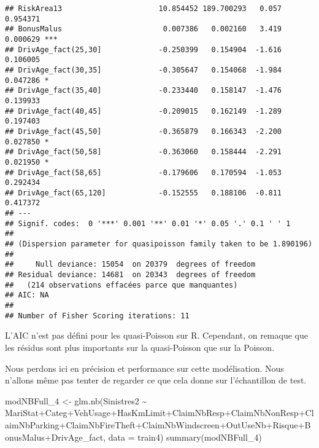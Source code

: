 \documentclass[
]{article}
\newenvironment{Shaded}{\begin{snugshade}}{\end{snugshade}}
\newcommand{\AttributeTok}[1]{\textcolor[rgb]{0.77,0.63,0.00}{#1}}
\newcommand{\FunctionTok}[1]{\textcolor[rgb]{0.00,0.00,0.00}{#1}}
\newcommand{\NormalTok}[1]{#1}
\newcommand{\OtherTok}[1]{\textcolor[rgb]{0.56,0.35,0.01}{#1}}
\newcommand{\SpecialCharTok}[1]{\textcolor[rgb]{0.00,0.00,0.00}{#1}}
\begin{document}
\begin{verbatim}
## RiskArea13                      10.854452 189.700293   0.057 0.954371    
## BonusMalus                       0.007386   0.002160   3.419 0.000629 ***
## DrivAge_fact(25,30]             -0.250399   0.154904  -1.616 0.106005    
## DrivAge_fact(30,35]             -0.305647   0.154068  -1.984 0.047286 *  
## DrivAge_fact(35,40]             -0.233440   0.158147  -1.476 0.139933    
## DrivAge_fact(40,45]             -0.209015   0.162149  -1.289 0.197403    
## DrivAge_fact(45,50]             -0.365879   0.166343  -2.200 0.027850 *  
## DrivAge_fact(50,58]             -0.363060   0.158444  -2.291 0.021950 *  
## DrivAge_fact(58,65]             -0.179606   0.170594  -1.053 0.292434    
## DrivAge_fact(65,120]            -0.152555   0.188106  -0.811 0.417372    
## ---
## Signif. codes:  0 '***' 0.001 '**' 0.01 '*' 0.05 '.' 0.1 ' ' 1
## 
## (Dispersion parameter for quasipoisson family taken to be 1.890196)
## 
##     Null deviance: 15054  on 20379  degrees of freedom
## Residual deviance: 14681  on 20343  degrees of freedom
##   (214 observations effacées parce que manquantes)
## AIC: NA
## 
## Number of Fisher Scoring iterations: 11
\end{verbatim}

L'AIC n'est pas défini pour les quasi-Poisson sur R. Cependant, on
remaque que les résidus sont plus importants sur la quasi-Poisson que
sur la Poisson.

Nous perdons ici en précision et performance sur cette modélisation.
Nous n'allons même pas tenter de regarder ce que cela donne sur
l'échantillon de test.

\begin{Shaded}
\begin{Highlighting}[]
\NormalTok{modNBFull\_4 }\OtherTok{\textless{}{-}} \FunctionTok{glm.nb}\NormalTok{(Sinistres2 }\SpecialCharTok{\textasciitilde{}}\NormalTok{ MariStat}\SpecialCharTok{+}\NormalTok{Categ}\SpecialCharTok{+}\NormalTok{VehUsage}\SpecialCharTok{+}\NormalTok{HasKmLimit}\SpecialCharTok{+}\NormalTok{ClaimNbResp}\SpecialCharTok{+}\NormalTok{ClaimNbNonResp}\SpecialCharTok{+}\NormalTok{ClaimNbParking}\SpecialCharTok{+}\NormalTok{ClaimNbFireTheft}\SpecialCharTok{+}\NormalTok{ClaimNbWindscreen}\SpecialCharTok{+}\NormalTok{OutUseNb}\SpecialCharTok{+}\NormalTok{Risque}\SpecialCharTok{+}\NormalTok{BonusMalus}\SpecialCharTok{+}\NormalTok{DrivAge\_fact, }\AttributeTok{data =}\NormalTok{ train4)}
\FunctionTok{summary}\NormalTok{(modNBFull\_4)}
\end{Highlighting}
\end{Shaded}
\end{document}

